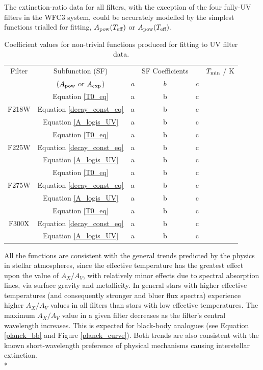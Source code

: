 \documentclass[12pt, a4paper]{report}
\begin{document}
The extinction-ratio data for all filters, with the exception of the four fully-UV filters in the WFC3 system, could be accurately modelled by the simplest functions trialled for fitting, $A_{\textnormal{pow}} (T_{\textnormal{eff}})$ or $A_{\textnormal{pow}} (T_{\textnormal{eff}})$.
\begin{table}
\begin{center}
\begin{tabular}{cccccc}
\hline

Filter &  Subfunction (SF) & & SF Coefficients & & $T_{\textnormal{min}}$ / K \\
 & ($A_{\textnormal{pow}}$ or $A_{\textnormal{exp}}$) & $a$ & $b$ & $c$ \\
\hline
& Equation \ref{T0_eq} & a & b & c \\
F218W & Equation \ref{decay_const_eq} & a & b & c \\
& Equation \ref{A_logis_UV} & a & b & c \\
& Equation \ref{T0_eq} & a & b & c \\
F225W & Equation \ref{decay_const_eq} & a & b & c \\
& Equation \ref{A_logis_UV} & a & b & c \\
& Equation \ref{T0_eq} & a & b & c \\
F275W & Equation \ref{decay_const_eq} & a & b & c \\
& Equation \ref{A_logis_UV} & a & b & c \\
& Equation \ref{T0_eq} & a & b & c \\
F300X & Equation \ref{decay_const_eq} & a & b & c \\
& Equation \ref{A_logis_UV} & a & b & c \\
\hline
\end{tabular}
\caption{Coefficient values for non-trivial functions produced for fitting to UV filter data.}
\label{UV_coeffs_table}
\end{center}
\end{table}

All the functions are consistent with the general trends predicted by the physics in stellar atmospheres, since the effective temperature has the greatest effect upon the value of $A_{X}/A_{V}$, with relatively minor effects due to spectral absorption lines, via surface gravity and metallicity. In general stars with higher effective temperatures (and consequently stronger and bluer flux spectra) experience higher $A_{X}/A_{V}$ values in all filters than stars with low effective temperatures. The maximum $A_{X}/A_{V}$ value in a given filter decreases as the filter's central wavelength increases. This is expected for black-body analogues (see Equation \ref{planck_bb} and Figure \ref{planck_curve}). Both trends are also consistent with the known short-wavelength preference of physical mechanisms causing interstellar extinction.\\*
\end{document}
